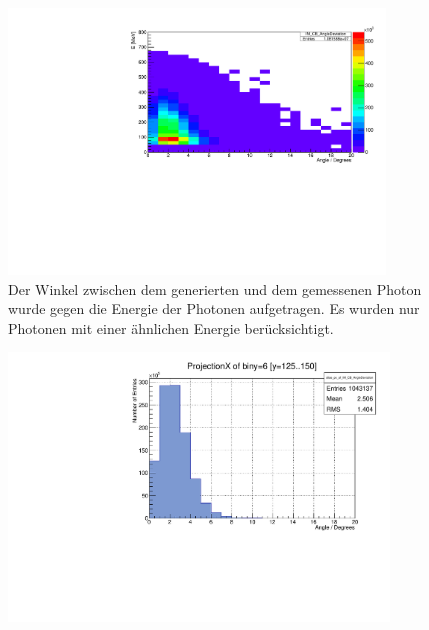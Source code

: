 \documentclass[a4paper,11pt,oneside,final,german,openbib,pdftex]{scrbook}
\begin{document}
{\begin{figure}[h!]
	\begin{center}
		\includegraphics[width=100mm]{20171804TrueCandsAngleDeviation}
		\caption{Der Winkel zwischen dem generierten und dem gemessenen Photon wurde gegen die Energie der Photonen aufgetragen. Es wurden nur Photonen mit einer \"ahnlichen Energie ber\"ucksichtigt.}
	\end{center}
\end{figure}


\begin{figure}[h!]
	\centering
	\begin{minipage}{0.45\textwidth}
		\centering
		\includegraphics[width=0.9\textwidth]{20171804MCTrueCandidatsAngleDeviation125MeV}
		

\end{minipage}
\end{figure}}
\end{document}
